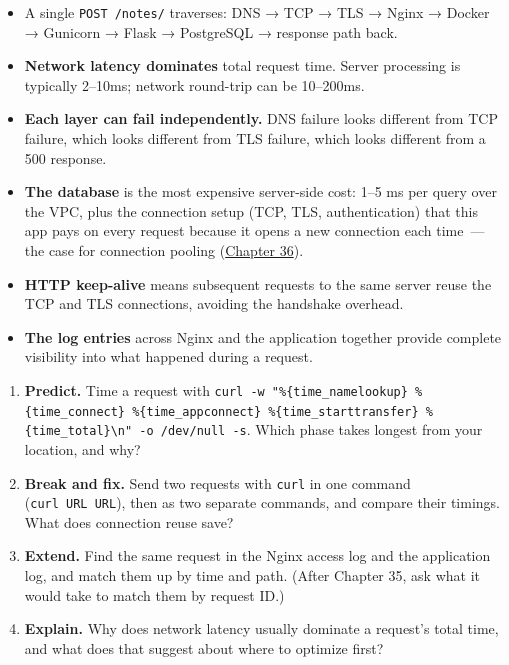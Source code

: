 \label{29-client-server-journey:key-takeaways}
\begin{takeaways}

\begin{itemize}
\tightlist
\item
  A single \texttt{POST\ /notes/} traverses: DNS → TCP → TLS → Nginx → Docker → Gunicorn → Flask → PostgreSQL → response path back.
\item
  \textbf{Network latency dominates} total request time. Server processing is typically 2--10ms; network round-trip can be 10--200ms.
\item
  \textbf{Each layer can fail independently.} DNS failure looks different from TCP failure, which looks different from TLS failure, which looks different from a 500 response.
\item
  \textbf{The database} is the most expensive server-side cost: 1--5 ms per query over the VPC, plus the connection setup (TCP, TLS, authentication) that this app pays on every request because it opens a new connection each time~--- the case for connection pooling (\hyperref[ch:36-scaling-load]{Chapter 36}).
\item
  \textbf{HTTP keep-alive} means subsequent requests to the same server reuse the TCP and TLS connections, avoiding the handshake overhead.
\item
  \textbf{The log entries} across Nginx and the application together provide complete visibility into what happened during a request.
\end{itemize}

\end{takeaways}

\label{29-client-server-journey:exercises}

\begin{enumerate}
\def\labelenumi{\arabic{enumi}.}
\tightlist
\item
  \textbf{Predict.} Time a request with \texttt{curl\ -}\allowbreak{}\texttt{w\ "\%\{time\_}\allowbreak{}\texttt{namelookup\}\ \%\{time\_}\allowbreak{}\texttt{connect\}\ \%\{time\_}\allowbreak{}\texttt{appconnect\}\ \%\{time\_}\allowbreak{}\texttt{starttransfer\}\ \%\{time\_}\allowbreak{}\texttt{total\}\textbackslash{}n"\ -}\allowbreak{}\texttt{o\ /}\allowbreak{}\texttt{dev/}\allowbreak{}\texttt{null\ -}\allowbreak{}\texttt{s}. Which phase takes longest from your location, and why?
\item
  \textbf{Break and fix.} Send two requests with \texttt{curl} in one command (\texttt{curl\ URL\ URL}), then as two separate commands, and compare their timings. What does connection reuse save?
\item
  \textbf{Extend.} Find the same request in the Nginx access log and the application log, and match them up by time and path. (After Chapter 35, ask what it would take to match them by request ID.)
\item
  \textbf{Explain.} Why does network latency usually dominate a request's total time, and what does that suggest about where to optimize first?
\end{enumerate}

